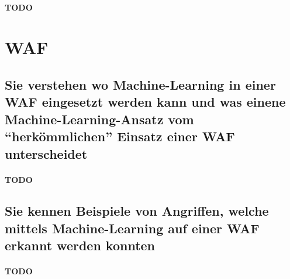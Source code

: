 \documentclass[10pt,a4paper]{article}
\begin{document}
\paragraph*{TODO}

\section{WAF}
\subsection*{Sie verstehen wo Machine-Learning in einer WAF eingesetzt werden kann und was einene Machine-Learning-Ansatz vom "`herkömmlichen"' Einsatz einer WAF unterscheidet}
\paragraph*{TODO}
\subsection*{Sie kennen Beispiele von Angriffen, welche mittels Machine-Learning auf einer WAF erkannt werden konnten}
\paragraph*{TODO}
\end{document}
